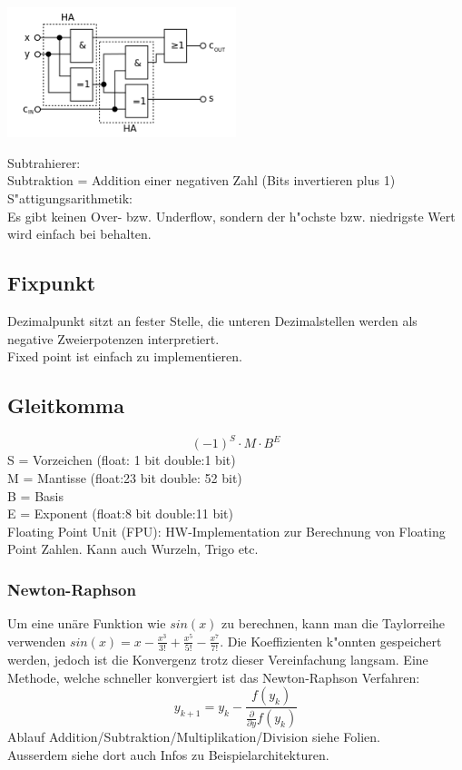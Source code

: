 \begin{flushleft}
{\includegraphics[width=0.5\textwidth]{images/Arithmetik/volladdierer.png}}
\label{Fig: Volladdierer}
\end{flushleft}

Subtrahierer:\\
Subtraktion = Addition einer negativen Zahl (Bits invertieren plus 1)\\

S"attigungsarithmetik:\\
Es gibt keinen Over- bzw. Underflow, sondern der h"ochste bzw. niedrigste Wert wird einfach bei behalten.\\
\subsection{Fixpunkt}
Dezimalpunkt sitzt an fester Stelle, die unteren Dezimalstellen werden als negative Zweierpotenzen interpretiert. \\
Fixed point ist einfach zu implementieren. 
\subsection{Gleitkomma}
\begin{equation}
(-1)^S\cdot M \cdot B^E
\end{equation}
S = Vorzeichen (float: 1 bit double:1 bit)\\
M = Mantisse (float:23 bit double: 52 bit)\\
B = Basis \\
E = Exponent (float:8 bit double:11 bit)\\

Floating Point Unit (FPU): HW-Implementation zur Berechnung von Floating Point Zahlen. Kann auch Wurzeln, Trigo etc.\\

\subsubsection{Newton-Raphson}
Um eine unäre Funktion wie $sin(x)$ zu berechnen, kann man die Taylorreihe verwenden $sin(x) = x - \frac{x^3}{3!} + \frac{x^5}{5!} - \frac{x^7}{7!}$. Die Koeffizienten k"onnten gespeichert werden, jedoch ist die Konvergenz trotz dieser Vereinfachung langsam. 
Eine Methode, welche schneller konvergiert ist das Newton-Raphson Verfahren: 
\begin{equation}
y_{k+1} = y_k - \frac{f(y_k)}{\frac{\partial}{\partial y}f(y_k)}
\end{equation}
Ablauf Addition/Subtraktion/Multiplikation/Division siehe Folien.\\
Ausserdem siehe dort auch Infos zu Beispielarchitekturen.


